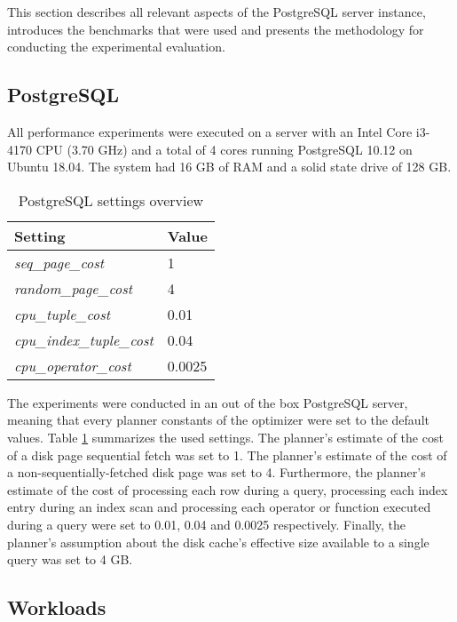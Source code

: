 \label{sec:experimental_setup}

This section describes all relevant aspects of the PostgreSQL server instance, introduces the benchmarks that were used and presents the methodology for conducting the experimental evaluation.

\subsection{PostgreSQL}
 
All performance experiments were executed on a server with an Intel Core i3-4170 CPU (3.70 GHz) and a total of 4 cores running PostgreSQL 10.12 on Ubuntu 18.04. The system had 16 GB of RAM and a solid state drive of 128 GB.

\begin{table}[H]
\centering
\begin{tabular*}{0.6\textwidth}{p{} p{}}
\hline
\textbf{Setting}                 & \textbf{Value} \\ \hline
\textit{seq\_page\_cost}         & 1              \\
\textit{random\_page\_cost}      & 4              \\
\textit{cpu\_tuple\_cost}        & 0.01           \\
\textit{cpu\_index\_tuple\_cost} & 0.04           \\
\textit{cpu\_operator\_cost}     & 0.0025         \\ \hline
\end{tabular*}
\caption{PostgreSQL settings overview}
\label{tab:settings}
\end{table}

The experiments were conducted in an out of the box PostgreSQL server, meaning that every planner constants of the optimizer were set to the default values. Table \ref{tab:settings} summarizes the used settings. The planner's estimate of the cost of a disk page sequential fetch was set to 1. The planner's estimate of the cost of a non-sequentially-fetched disk page was set to 4. Furthermore, the planner's estimate of the cost of processing each row during a query, processing each index entry during an index scan and processing each operator or function executed during a query were set to 0.01, 0.04 and 0.0025 respectively. Finally, the planner's assumption about the disk cache's effective size available to a single query was set to 4 GB.

\subsection{Workloads}
\label{sec:workloads}

